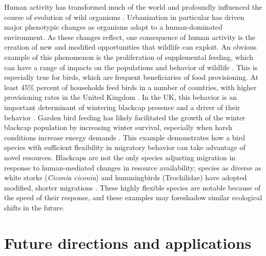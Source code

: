 \documentclass[a4paper, nobind]{templates/ociamthesis}
\begin{document}
Human activity has transformed much of the world and profoundly influenced the course of evolution of wild organisms \autocite{palumbiHumansWorldGreatest2001,boivinEcologicalConsequencesHuman2016,sullivanHumanBehaviourLongterm2017,johnsonEvolutionLifeUrban2017}. Urbanization in particular has driven major phenotypic changes \autocite{albertiGlobalUrbanSignatures2017} as organisms adapt to a human-dominated environment. As these changes reflect, one consequence of human activity is the creation of new and modified opportunities that wildlife can exploit. An obvious example of this phenomenon is the proliferation of supplemental feeding, which can have a range of impacts on the populations and behavior of wildlife \autocite{galbraithSupplementaryFeedingRestructures2015,coxHumanNatureInteractions2018,plummerCompositionBritishBird2019}. This is especially true for birds, which are frequent beneficiaries of food provisioning. At least 45\% percent of households feed birds in a number of countries, with higher provisioning rates in the United Kingdom \autocite{galbraithRisksDriversWild2014,daviesHouseholdFactorsInfluencing2012,orrosWildBirdFeeding2015}. In the UK, this behavior is an important determinant of wintering blackcap presence and a driver of their behavior \autocites[\textbf{Chapter \ref{blackcap-uk}};][]{plummerSupplementaryFeedingGardens2015}{plummerCompositionBritishBird2019}. Garden bird feeding has likely facilitated the growth of the winter blackcap population by increasing winter survival, especially when harsh conditions increase energy demands \autocite[\textbf{Chapter \ref{blackcap-uk}};][]{plummerSupplementaryFeedingGardens2015}. This example demonstrates how a bird species with sufficient flexibility in migratory behavior can take advantage of novel resources. Blackcaps are not the only species adjusting migration in response to human-mediated changes in resource availability; species as diverse as white storks (\emph{Ciconia ciconia}) and hummingbirds (Trochilidae) have adopted modified, shorter migrations \autocite{satterfieldResponsesMigratorySpecies2018}. These highly flexible species are notable because of the speed of their response, and these examples may foreshadow similar ecological shifts in the future.

\hypertarget{future-directions-and-applications}{%
\section*{Future directions and applications}\label{future-directions-and-applications}}
\end{document}
